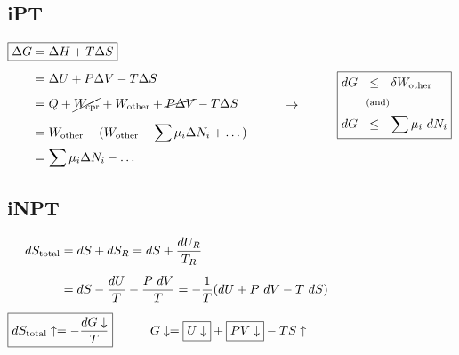 \documentclass[12pt]{article}
\begin{document}
\vspace{10pt}
\subsection{iPT}
\(\begin{aligned}
    \Aboxed{ \Delta G &= \Delta H + T \Delta S }\\[5pt]
    &= \Delta U + P \Delta V - T \Delta S\\[5pt]
    &= Q + \cancel{ W_\text{cpr} } + W_\text{other} + \cancel{ P \Delta V } - T \Delta S\\[5pt]
    &= W_\text{other} - ( W_\text{other} - \sum \mu_i \Delta N_i + \dots )\\
    &= \sum \mu_i \Delta N_i - \dots
\end{aligned}
\hspace{1cm} \rightarrow \hspace{1cm} \boxed{ \begin{aligned}
    dG \ \ &\leq \ \ \delta W_\text{other}\\
    &\text{\scriptsize(and)}\\
    dG \ \ &\leq \ \ \sum \mu_i\ dN_i
\end{aligned} } \)

\vspace{5pt}
\subsection{iNPT}
\(\begin{aligned}
    dS_\text{total} &= dS + dS_R = dS + \frac{dU_R}{T_R} \\[5pt]
    &= dS - \frac{dU}{T} - \frac{P\ dV}{T}= -\frac{1}{T} (dU + P\ dV- T\ dS)\\[5pt]
    \Aboxed{ dS_\text{total}\uparrow &= - \frac{dG\downarrow}{T} } 
    \indent \indent G\downarrow = \boxed{U\downarrow} + \boxed{PV\downarrow} - TS\uparrow
\end{aligned}\)

\newpage
\end{document}
